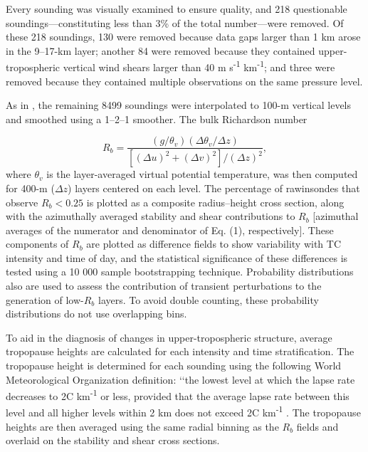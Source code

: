 Every sounding was visually examined to ensure quality, and 218 questionable soundings---constituting less than 3\% of the total number---were removed.
Of these 218 soundings, 130 were removed because data gaps larger than 1 km arose in the 9--17-km layer; another 84 were removed because they contained upper-tropospheric  vertical  wind shears larger than 40 m s\textsuperscript{-1} km\textsuperscript{-1}; and three were removed because they contained multiple observations on the same pressure level.

As in \cite{Molinarietal2014}, the remaining 8499 soundings were interpolated to 100-m vertical levels and smoothed using a 1–2–1 smoother.
The bulk Richardson number

   \begin{equation} \label{eq:rb}
   R_b = \frac{(g/\theta_v)(\Delta\theta_v/\Delta z)}{[(\Delta u)^2+(\Delta v)^2]/(\Delta z)^2},
   \end {equation}
where $\theta_v$ is the layer-averaged virtual potential temperature, was then computed for 400-m ($\Delta z$) layers centered on each level.
The percentage of rawinsondes that observe $R_b < 0.25$ is plotted as a composite radius--height cross section, along with the azimuthally averaged stability and shear contributions to $R_b$ [azimuthal averages of the numerator and denominator of Eq. (1), respectively].
These components of $R_b$ are plotted as difference fields to show variability with TC intensity and time of day, and the statistical significance of these differences is tested using a 10 000 sample bootstrapping technique.
Probability distributions also are used to assess the contribution of transient perturbations to the generation of low-$R_b$ layers.
To avoid double counting, these probability distributions do not use overlapping bins.

To  aid  in  the  diagnosis  of  changes  in  upper-tropospheric structure, average tropopause heights are calculated for each intensity and time stratification.
The tropopause height is determined for each sounding using the following World Meteorological Organization definition: ‘‘the lowest level at which the lapse rate decreases to 2\textdegree{}C km\textsuperscript{-1} or less, provided that the average lapse rate between this level and all higher levels within 2 km does not exceed 2\textdegree{}C km\textsuperscript{-1} \citep{WMO1957}.
The tropopause heights are then averaged using the same radial binning as the $R_b$ fields and overlaid on the stability and shear cross sections.

